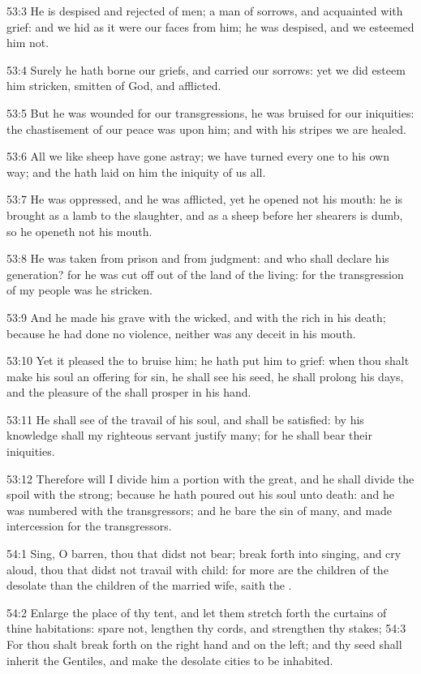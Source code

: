 53:3 He is despised and rejected of men; a man of sorrows, and
acquainted with grief: and we hid as it were our faces from him; he
was despised, and we esteemed him not.

53:4 Surely he hath borne our griefs, and carried our sorrows: yet we
did esteem him stricken, smitten of God, and afflicted.

53:5 But he was wounded for our transgressions, he was bruised for our
iniquities: the chastisement of our peace was upon him; and with his
stripes we are healed.

53:6 All we like sheep have gone astray; we have turned every one to
his own way; and the \LORD hath laid on him the iniquity of us all.

53:7 He was oppressed, and he was afflicted, yet he opened not his
mouth: he is brought as a lamb to the slaughter, and as a sheep before
her shearers is dumb, so he openeth not his mouth.

53:8 He was taken from prison and from judgment: and who shall declare
his generation? for he was cut off out of the land of the living: for
the transgression of my people was he stricken.

53:9 And he made his grave with the wicked, and with the rich in his
death; because he had done no violence, neither was any deceit in his
mouth.

53:10 Yet it pleased the \LORD to bruise him; he hath put him to grief:
when thou shalt make his soul an offering for sin, he shall see his
seed, he shall prolong his days, and the pleasure of the \LORD shall
prosper in his hand.

53:11 He shall see of the travail of his soul, and shall be satisfied:
by his knowledge shall my righteous servant justify many; for he shall
bear their iniquities.

53:12 Therefore will I divide him a portion with the great, and he
shall divide the spoil with the strong; because he hath poured out his
soul unto death: and he was numbered with the transgressors; and he
bare the sin of many, and made intercession for the transgressors.

54:1 Sing, O barren, thou that didst not bear; break forth into
singing, and cry aloud, thou that didst not travail with child: for
more are the children of the desolate than the children of the married
wife, saith the \LORD.

54:2 Enlarge the place of thy tent, and let them stretch forth the
curtains of thine habitations: spare not, lengthen thy cords, and
strengthen thy stakes; 54:3 For thou shalt break forth on the right
hand and on the left; and thy seed shall inherit the Gentiles, and
make the desolate cities to be inhabited.

